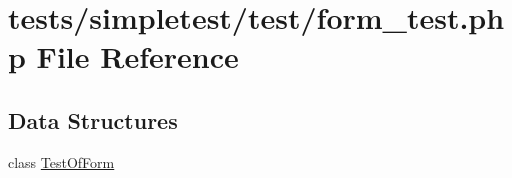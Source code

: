 \hypertarget{form__test_8php}{\section{tests/simpletest/test/form\-\_\-test.php File Reference}
\label{form__test_8php}
}
\subsection*{Data Structures}
\begin{DoxyCompactItemize}
\item 
class \hyperlink{class_test_of_form}{Test\-Of\-Form}
\end{DoxyCompactItemize}
